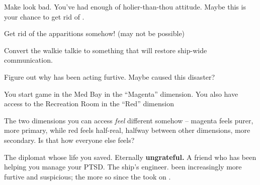 \documentclass[char]{TMFHope}
\begin{document}
\begin{itemz}[Goals]
	\item Make \cDip{} look bad. You've had enough of \cDip{\their} holier-than-thou attitude. Maybe this is your chance to get rid of \cDip{\them}.
	\item Get rid of the apparitions somehow! (may not be possible)
	\item Convert the walkie talkie to something that will restore ship-wide communication.
	\item Figure out why \cEng{} has been acting furtive.  Maybe \cEng{\they} caused this disaster?
\end{itemz}

\begin{itemz}[Notes]
	\item You start game in the Med Bay in the ``Magenta'' dimension. You also have access to the Recreation Room in the ``Red'' dimension
	\item The two dimensions you can access {\em feel} different somehow -- magenta feels purer, more primary, while red feels half-real, halfway between other dimensions, more secondary.  Is that how everyone else feels?
\end{itemz}

\begin{contacts}
	\contact{\cDip{}} The diplomat whose life you saved. Eternally \textbf{ungrateful.}
	\contact{\cNav{}} A friend who has been helping you manage your PTSD.
	\contact{\cEng{}} The ship's engineer. \cEng{\They} \cEng{\have} been increasingly more furtive and suspicious; the more so since the \pNew{} took on \cBoy{}.
\end{contacts}
\end{document}
